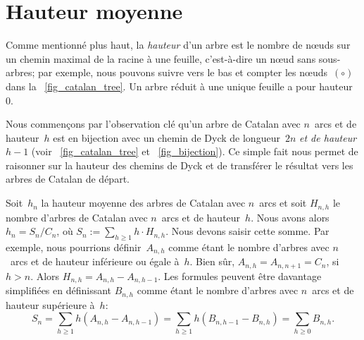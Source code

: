 \section{Hauteur moyenne}
\label{sec_Catalan_height}

Comme mentionné plus haut, la \emph{hauteur} d'un arbre est le nombre
de n{\oe}uds sur un chemin maximal de la racine à une feuille,
c'est-à-dire un n{\oe}ud sans sous-arbres; par exemple, nous pouvons
suivre vers le bas et compter les n{\oe}uds~\((\circ)\) dans la
\fig~\ref{fig_catalan_tree}. Un arbre réduit à une unique feuille a
pour hauteur~\(0\).

Nous commençons par l'observation clé qu'un arbre de Catalan avec
\(n\)~arcs et de hauteur~\(h\) est en bijection avec un chemin de Dyck
de longueur~\(2n\) \emph{et de hauteur \(h-1\)} (voir
\fig~\vref{fig_catalan_tree} et \fig~\ref{fig_bijection}). Ce simple
fait nous permet de raisonner sur la hauteur des chemins de Dyck et de
transférer le résultat vers les arbres de Catalan de départ.

Soit~\(h_n\) la hauteur moyenne des arbres de Catalan avec \(n\)~arcs
et soit \(H_{n,h}\) le nombre d'arbres de Catalan avec \(n\)~arcs et
de hauteur~\(h\). Nous avons alors \(h_n = S_n/C_{n}\), où \(S_n :=
\sum_{h \geqslant 1} h \cdot H_{n,h}\). Nous devons saisir cette
somme. Par exemple, nous pourrions définir~\(A_{n,h}\) comme étant le
nombre d'arbres avec \(n\)~arcs et de hauteur inférieure ou égale
à~\(h\). Bien sûr, \(A_{n,h} = A_{n,n+1} = C_{n}\), si \(h >
n\). Alors \(H_{n,h} = A_{n,h}-A_{n,h-1}\). Les formules peuvent être
davantage simplifiées en définissant \(B_{n,h}\) comme étant le nombre
d'arbres avec \(n\)~arcs et de hauteur supérieure à~\(h\):
\begin{equation}
S_n = \sum_{h \geqslant 1}h(A_{n,h}-A_{n,h-1})
    = \sum_{h \geqslant 1}h(B_{n,h-1}-B_{n,h}) = \sum_{h\geqslant 0} B_{n,h}.
\label{eq_Sn}
\end{equation} 

